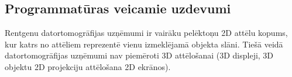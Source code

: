 \subsection{Programmatūras veicamie uzdevumi}

Rentgenu datortomogrāfijas uzņēmumi ir vairāku pelēktoņu 2D attēlu kopums, kur katrs no attēliem reprezentē vienu izmeklējamā objekta slāni. Tiešā veidā datortomogrāfijas uzņēmumi nav piemēroti 3D attēlošanai (3D displeji, 3D objektu 2D projekciju attēlošana 2D ekrānos).
